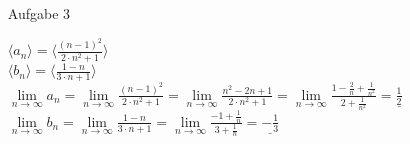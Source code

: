 \documentclass{scrreprt}
\begin{document}
\begin{enumerate}
{
        }
        \item[Aufgabe 3]{
            $\langle a_n\rangle = \langle \frac{(n-1)^2}{2\cdot n^2 + 1}\rangle$\\
            $\langle b_n\rangle = \langle \frac{1-n}{3\cdot n + 1}\rangle$\\
            $\lim \limits_{n \to \infty} a_n =
            \lim \limits_{n \to \infty} \frac{(n-1)^2}{2\cdot n^2 + 1} =
            \lim \limits_{n \to \infty} \frac{n^2-2n+1}{2\cdot n^2 + 1} =
            \lim \limits_{n \to \infty} \frac{1-\frac{2}{n}+\frac{1}{n^2}}{2 + \frac{1}{n^2}} =
            \underline{\frac{1}{2}}$\\
            $\lim \limits_{n \to \infty} b_n =
            \lim \limits_{n \to \infty} \frac{1-n}{3\cdot n + 1} =
            \lim \limits_{n \to \infty} \frac{-1+ \frac{1}{n}}{3 + \frac{1}{n}} =
            \underline{-\frac{1}{3}}$

}
\end{enumerate}
\end{document}
